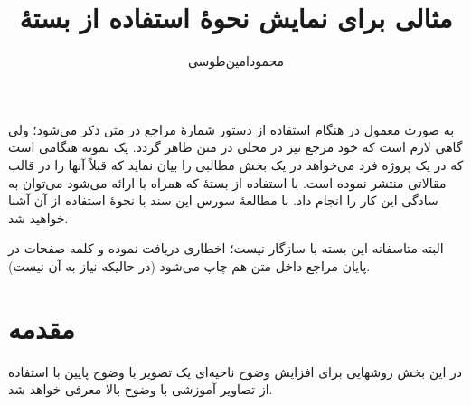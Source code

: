 \documentclass[11pt,a4paper]{article}
\title{مثالی برای نمایش نحوهٔ استفاده از بستهٔ \lr{bibentry}}
\author{محمودامین‌طوسی}\date{}
\begin{document}
\maketitle
به صورت معمول در هنگام استفاده از دستور  شمارهٔ مراجع در متن ذکر می‌شود؛ ولی گاهی لازم است که خود مرجع نیز در محلی در متن ظاهر گردد. یک نمونه هنگامی است که در یک پروژه فرد می‌خواهد در یک بخش مطالبی را بیان نماید که قبلاً آنها را در قالب مقالاتی منتشر نموده است. 
با استفاده از بستهٔ  که همراه با  ارائه می‌شود می‌توان به سادگی این کار را انجام داد.
با مطالعهٔ سورس این سند با نحوهٔ استفاده از آن آشنا خواهید شد. 

البته متاسفانه این بسته با  سازگار نیست؛ اخطاری دریافت نموده و کلمه صفحات در پایان مراجع داخل متن هم چاپ می‌شود (در حالیکه نیاز به آن نیست).

\section{مقدمه}

در این بخش روشهایی برای افزایش وضوح ناحیه‌ای یک تصویر با وضوح پایین با استفاده از تصاویر آموزشی با وضوح بالا معرفی خواهد شد.


\end{document}
